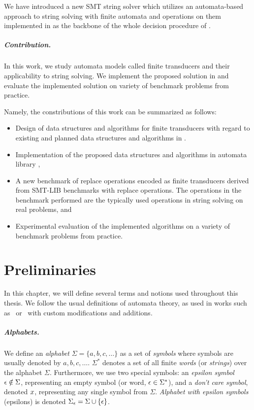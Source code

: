 We have introduced a new SMT string solver \noodler which utilizes an automata-based approach to string solving with finite automata and operations on them implemented in \mata as the backbone of the whole decision procedure of \noodler.

\paragraph{Contribution.}
In this work, we study automata models called finite transducers and their applicability to string solving. We implement the proposed solution in \mata and evaluate the implemented solution on variety of benchmark problems from practice.

Namely, the constributions of this work can be summarized as follows:
\begin{itemize}
  \item Design of data structures and algorithms for finite transducers with regard to existing and planned data structures and algorithms in \mata.
  \item Implementation of the proposed data structures and algorithms in automata library \mata,
  \item A new benchmark of replace operations encoded as finite transducers derived from SMT-LIB benchmarks with replace operations. The operations in the benchmark performed are the typically used operations in string solving on real problems, and
  \item Experimental evaluation of the implemented algorithms on a variety of benchmark problems from practice.
\end{itemize}

\chapter{Preliminaries}
In this chapter, we will define several terms and notions used throughout this thesis.
We follow the usual definitions of automata theory, as used in works such as~\cite{Esparza} or~\cite{Sipser} with custom modifications and additions.

\paragraph{Alphabets.}
We define an \emph{alphabet} $\Sigma = \{ a, b, c, \ldots \}$ as a set of \emph{symbols} where
symbols are usually denoted by $a, b, c, \ldots$.
$\Sigma^*$ denotes a set of all finite \emph{words} (or \emph{strings}) over the alphabet $\Sigma$.
Furthermore, we use two special symbols: an \emph{epsilon symbol} $\epsilon \notin \Sigma$, representing an empty symbol (or word, $\epsilon \in \Sigma^*$), and a \emph{don't care symbol}, denoted $x$, representing any single symbol from $\Sigma$.
\emph{Alphabet with epsilon symbols} (epsilons) is denoted $\Sigma_\epsilon = \Sigma \cup \{ \epsilon \}$.

